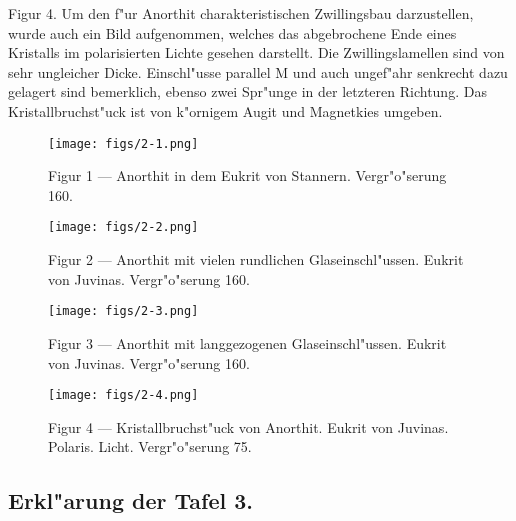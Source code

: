 \documentclass[a4paper, 11pt, oneside, polutonikogreek, german]{article}
\begin{document}
Figur 4. Um den f"ur Anorthit charakteristischen Zwillingsbau darzustellen, wurde auch ein Bild aufgenommen, welches das abgebrochene Ende eines Kristalls im polarisierten Lichte gesehen darstellt. Die Zwillingslamellen sind von sehr ungleicher Dicke. Einschl"usse parallel M und auch ungef"ahr senkrecht dazu gelagert sind bemerklich, ebenso zwei Spr"unge in der letzteren Richtung. Das Kristallbruchst"uck ist von k"ornigem Augit und Magnetkies umgeben.
\clearpage

\vspace*{\fill}
\begin{figure}[H]
\centering
\texttt{[image: figs/2-1.png]}
\caption{\small Figur 1 --- Anorthit in dem Eukrit von Stannern. Vergr"o"serung 160.}
\end{figure}
\vspace*{\fill}
\clearpage

\vspace*{\fill}
\begin{figure}[H]
\centering
\texttt{[image: figs/2-2.png]}
\caption{\small Figur 2 --- Anorthit mit vielen rundlichen Glaseinschl"ussen. Eukrit von Juvinas. Vergr"o"serung 160.}
\end{figure}
\vspace*{\fill}
\clearpage

\vspace*{\fill}
\begin{figure}[H]
\centering
\texttt{[image: figs/2-3.png]}
\caption{\small Figur 3 --- Anorthit mit langgezogenen Glaseinschl"ussen. Eukrit von Juvinas. Vergr"o"serung 160.}
\end{figure}
\vspace*{\fill}
\clearpage

\vspace*{\fill}
\begin{figure}[H]
\centering
\texttt{[image: figs/2-4.png]}
\caption{\small Figur 4 --- Kristallbruchst"uck von Anorthit. Eukrit von Juvinas. Polaris. Licht. Vergr"o"serung 75.}
\end{figure}
\vspace*{\fill}
\clearpage

\subsection{Erkl"arung der Tafel 3.}
\end{document}
